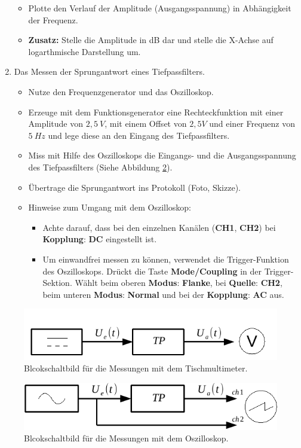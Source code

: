 \begin{enumerate}
\begin{itemize}
			\item Plotte den Verlauf der Amplitude (Ausgangsspannung) in Abhängigkeit der Frequenz.
			\item \textbf{Zusatz:} Stelle die Amplitude in dB dar und stelle die X-Achse auf logarthmische Darstellung um.
			\end{itemize}
	\item Das Messen der Sprungantwort eines Tiefpassfilters.
		\begin{itemize}
			\item Nutze den Frequenzgenerator und das Oszilloskop.
			\item Erzeuge mit dem Funktionsgenerator eine Rechteckfunktion mit einer Amplitude von $2,5~V$, mit einem Offset von $2,5 V$ und einer Frequenz von $5~Hz$ und lege diese an den Eingang des Tiefpassfilters.
			\item Miss mit Hilfe des Oszilloskops die Eingangs- und die Ausgangsspannung des Tiefpassfilters (Siehe Abbildung \ref{block2}).
			\item Übertrage die Sprungantwort ins Protokoll (Foto, Skizze).
			\item Hinweise zum Umgang mit dem Oszilloskop:
				\begin{itemize}
					\item Achte darauf, dass bei den einzelnen Kanälen (\textbf{CH1}, \textbf{CH2}) bei \textbf{Kopplung}: \textbf{DC} eingestellt ist.
					\item Um einwandfrei messen zu können, verwendet die Trigger-Funktion
            des Oszilloskops. Drückt die Taste \textbf{Mode/Coupling} in der
            Trigger-Sektion. Wählt beim oberen \textbf{Modus}: \textbf{Flanke}, bei \textbf{Quelle}: \textbf{CH2}, beim unteren \textbf{Modus}: \textbf{Normal} und bei der \textbf{Kopplung}: \textbf{AC} aus.
					\end{itemize}
			\end{itemize}
 	\end{enumerate} 

\begin{figure}[H]
	\centering
	\includegraphics[scale=1]{Messtechnik/Bilder/Block_Messung_Kennlinie.pdf}
	\caption{Blcokschaltbild für die Messungen mit dem Tischmultimeter.}
	\label{block1}
	\end{figure}

\begin{figure}[H]
	\centering
	\includegraphics[scale=1]{Messtechnik/Bilder/Block_Messung_oszi.pdf}
	\caption{Blcokschaltbild für die Messungen mit dem Oszilloskop.}
	\label{block2}
	\end{figure}
